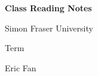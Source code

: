 \documentclass[12pt]{report}
\begin{document}
\begin{titlepage}
	\vspace*{5em}
	\begin{mdframed}[style=mystyle]
		\centering
		{\Huge\textbf{Class Reading Notes}}

		\vspace{1cm}

		{\large{Simon Fraser University}}

		\vspace{0.5cm}

		{\large{Term}}

		\vspace{0.5cm}

		{\large{Eric Fan}}
	\end{mdframed}
\end{titlepage}

\tableofcontents
\restoregeometry


\end{document}
